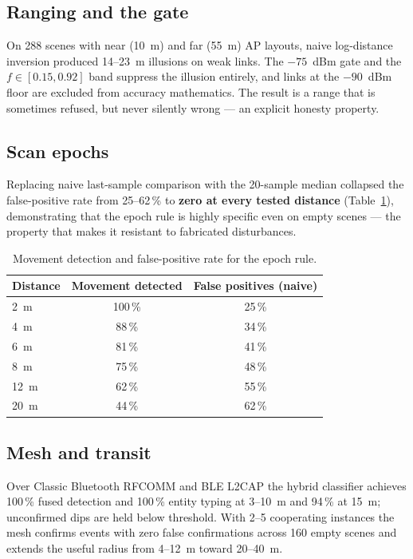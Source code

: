 \documentclass[journal,10pt]{IEEEtran}
\begin{document}
\subsection{Ranging and the gate}
On 288 scenes with near (10~m) and far (55~m) AP layouts, naive log-distance
inversion produced 14--23~m illusions on weak links. The $-75$~dBm gate and the
$f \in [0.15, 0.92]$ band suppress the illusion entirely, and links at the
$-90$~dBm floor are excluded from accuracy mathematics. The result is a range
that is sometimes refused, but never silently wrong --- an explicit honesty
property.

\subsection{Scan epochs}
Replacing naive last-sample comparison with the 20-sample median collapsed the
false-positive rate from 25--62\,\% to \textbf{zero at every tested distance}
(Table~\ref{tab:epoch}), demonstrating that the epoch rule is highly specific
even on empty scenes --- the property that makes it resistant to fabricated
disturbances.

\begin{table}[t]
  \centering
  \caption{Movement detection and false-positive rate for the epoch rule.}
  \label{tab:epoch}
  \footnotesize
  \begin{tabular}{@{}lcc@{}}
    \toprule
    Distance & Movement detected & False positives (naive) \\
    \midrule
    2~m & 100\,\% & 25\,\% \\
    4~m & 88\,\% & 34\,\% \\
    6~m & 81\,\% & 41\,\% \\
    8~m & 75\,\% & 48\,\% \\
    12~m & 62\,\% & 55\,\% \\
    20~m & 44\,\% & 62\,\% \\
    \bottomrule
  \end{tabular}
\end{table}

\subsection{Mesh and transit}
Over Classic Bluetooth RFCOMM and BLE L2CAP the hybrid classifier achieves
100\,\% fused detection and 100\,\% entity typing at 3--10~m and 94\,\% at
15~m; unconfirmed dips are held below threshold. With 2--5 cooperating
instances the mesh confirms events with zero false confirmations across 160
empty scenes and extends the useful radius from 4--12~m toward 20--40~m.
\end{document}
